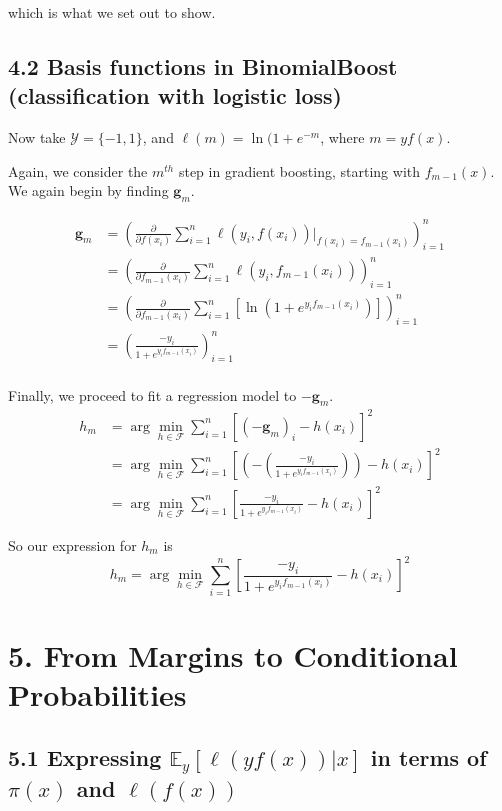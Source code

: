 \documentclass[paper=a4, fontsize=11pt]{scrartcl} %
\numberwithin{equation}{section} %
\numberwithin{figure}{section} %
\numberwithin{table}{section} %
\begin{document}
which is what we set out to show.

\subsection*{4.2 Basis functions in BinomialBoost (classification with logistic loss)}

Now take $\mathcal{Y} = \{-1, 1\}$, and $\ell(m) = \ln(1 + e^{-m}$, where $m = yf(x)$.

Again, we consider the $m^{th}$ step in gradient boosting, starting with $f_{m-1}(x)$. We again begin by finding $\mathbf{g}_m$.

\begin{align*}
\mathbf{g}_m &= \left( \frac{\partial}{\partial f(x_i)} \sum_{i = 1}^n \ell(y_i, f(x_i)) \Bigg|_{f(x_i) = f_{m - 1}(x_i)} \right)_{i = 1}^n \\
	&= \left( \frac{\partial}{\partial f_{m-1}(x_i)} \sum_{i = 1}^n \ell(y_i, f_{m-1}(x_i)) \right)_{i = 1}^n \\
	&= \left( \frac{\partial}{\partial f_{m-1}(x_i)} \sum_{i = 1}^n \left[\ln (1 + e^{y_i f_{m-1}(x_i)})\right] \right)_{i = 1}^n \\
	&= \left(\frac{-y_i}{1+e^{y_i f_{m-1}(x_i)}}\right)_{i = 1}^n \\
\end{align*}

Finally, we proceed to fit a regression model to $-\mathbf{g}_m$.
\begin{align*}
h_m &= \arg \min_{h \in \mathcal{F}} \sum_{i = 1}^n [(-\mathbf{g}_m)_i - h(x_i)]^2 \\
	&= \arg \min_{h \in \mathcal{F}} \sum_{i = 1}^n \left[\left(- \left(\frac{-y_i}{1+e^{y_i f_{m-1}(x_i)}}\right)\right) - h(x_i)\right]^2 \\
	&= \arg \min_{h \in \mathcal{F}} \sum_{i = 1}^n \left[ \frac{-y_i}{1+e^{y_i f_{m-1}(x_i)}} - h(x_i)\right]^2
\end{align*}

So our expression for $h_m$ is 
\[h_m = \arg \min_{h \in \mathcal{F}} \sum_{i = 1}^n \left[ \frac{-y_i}{1+e^{y_i f_{m-1}(x_i)}} - h(x_i)\right]^2\]


\section*{5. From Margins to Conditional Probabilities}
\subsection*{5.1 Expressing $\mathbb{E}_y[\ell(yf(x)) | x]$ in terms of $\pi(x)$ and $\ell(f(x))$}
\end{document}
